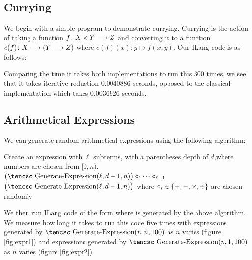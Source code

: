 \documentclass{llncs}
\newcounter{algo}
\begin{document}
\subsection{Currying}

We begin with a simple program to demonstrate currying.
Currying is the action of taking a function $f\colon X\times Y\longrightarrow Z$ and converting it to a function $c(f)\colon X\longrightarrow(Y\longrightarrow Z)$ where $c(f)(x)\colon y\mapsto f(x,y)$.
Our ILang code is as follows:



Comparing the time it takes both implementations to run this 300 times, we see that it takes iterative reduction 0.0040886 seconds, opposed to the classical implementation which takes 0.0036926 seconds.

\subsection{Arithmetical Expressions}

We can generate random arithmetical expressions using the following algorithm:

\medskip
\algorithm
\Comment Create an expression with $\ell$ subterms, with a parentheses depth of $d$,\cr where numbers are chosen from $[0,n)$.\EndComment
{}
     \vtop{\hsize=.8\hsize
        \noindent \Return an expression with $\ell$ randomly chosen numbers in\hfil\break $[0,n)$ and $\ell-1$ random operators in $\set{+,-,\times,\div}$.}
    \State \Return $\bigl(\hbox{\tencsc Generate-Expression}(\ell,d-1,n)\bigr)\circ_1\cdots\circ_{\ell-1}$
    \nonum\State \hfill$\bigl(\hbox{\tencsc Generate-Expression}(\ell,d-1,n)\bigr)$
    \nonum\State where $\circ_i\in\set{+,-,\times,\div}$ are chosen randomly
\EndFunc
\ealgorithm
\medskip

\noindent We then run ILang code of the form  where  is generated by the above algorithm.
We measure how long it takes to run this code five times with expressions generated by $\hbox{\tencsc Generate-Expression}(n,n,100)$ as $n$ varies (figure \ref{fig:expr1}) and
expressions generated by $\hbox{\tencsc Generate-Expression}(n,1,100)$ as $n$ varies (figure \ref{fig:expr2}).
\end{document}
